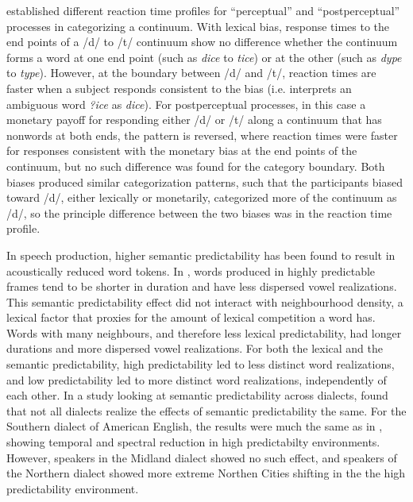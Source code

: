 \citet{Connine1987a} established different reaction time profiles for ``perceptual'' and ``postperceptual'' processes in categorizing a continuum.  With lexical bias, response times to the end points of a /d/ to /t/ continuum show no difference whether the continuum forms a word at one end point (such as \emph{dice} to \emph{tice}) or at the other (such as \emph{dype} to \emph{type}).  However, at the boundary between /d/ and /t/, reaction times are faster when a subject responds consistent to the bias (i.e. interprets an ambiguous word \emph{?ice} as \emph{dice}).  For postperceptual processes, in this case a monetary payoff for responding either /d/ or /t/ along a continuum that has nonwords at both ends, the pattern is reversed, where reaction times were faster for responses consistent with the monetary bias at the end points of the continuum, but no such difference was found for the category boundary.  Both biases produced similar categorization patterns, such that the participants biased toward /d/, either lexically or monetarily, categorized more of the continuum as /d/, so the principle difference between the two biases was in the reaction time profile.



In speech production, higher semantic predictability has been found to result in acoustically reduced word tokens.  
In \citet{Scarborough2010}, words produced in highly predictable frames tend to be shorter in duration and have less dispersed vowel realizations.  
This semantic predictability effect did not interact with neighbourhood density, a lexical factor that proxies for the amount of lexical competition a word has.  
Words with many neighbours, and therefore less lexical predictability, had longer durations and more dispersed vowel realizations.  
For both the lexical and the semantic predictability, high predictability led to less distinct word realizations, and low predictability led to more distinct word realizations, independently of each other.
In a study looking at semantic predictability across dialects, \citet{Clopper2008} found that not all dialects realize the effects of semantic predictability the same.  
For the Southern dialect of American English, the results were much the same as in \citet{Scarborough2010}, showing temporal and spectral reduction in high predictabilty environments.  
However, speakers in the Midland dialect showed no such effect, and speakers of the Northern dialect showed more extreme Northen Cities shifting in the the high predictability environment.



